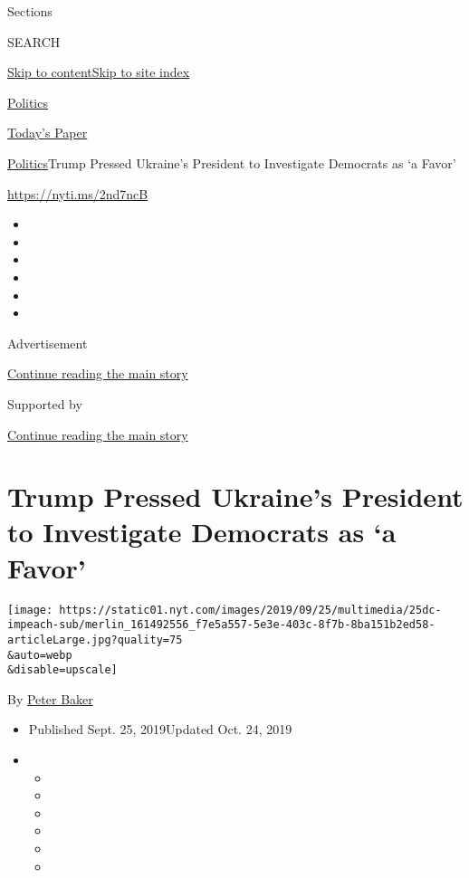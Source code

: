 Sections

SEARCH

\protect\hyperlink{site-content}{Skip to
content}\protect\hyperlink{site-index}{Skip to site index}

\href{https://www.nytimes.com/section/politics}{Politics}

\href{https://myaccount.nytimes.com/auth/login?response_type=cookie\&client_id=vi}{}

\href{https://www.nytimes.com/section/todayspaper}{Today's Paper}

\href{/section/politics}{Politics}\textbar{}Trump Pressed Ukraine's
President to Investigate Democrats as `a Favor'

\url{https://nyti.ms/2nd7ncB}

\begin{itemize}
\item
\item
\item
\item
\item
\item
\end{itemize}

Advertisement

\protect\hyperlink{after-top}{Continue reading the main story}

Supported by

\protect\hyperlink{after-sponsor}{Continue reading the main story}

\hypertarget{trump-pressed-ukraines-president-to-investigate-democrats-as-a-favor}{%
\section{Trump Pressed Ukraine's President to Investigate Democrats as
`a
Favor'}\label{trump-pressed-ukraines-president-to-investigate-democrats-as-a-favor}}

\texttt{[image: https://static01.nyt.com/images/2019/09/25/multimedia/25dc-impeach-sub/merlin\_161492556\_f7e5a557-5e3e-403c-8f7b-8ba151b2ed58-articleLarge.jpg?quality=75\\\&auto=webp\\\&disable=upscale]}

By \href{https://www.nytimes.com/by/peter-baker}{Peter Baker}

\begin{itemize}
\item
  Published Sept. 25, 2019Updated Oct. 24, 2019
\item
  \begin{itemize}
  \item
  \item
  \item
  \item
  \item
  \item
  \end{itemize}
\end{itemize}

